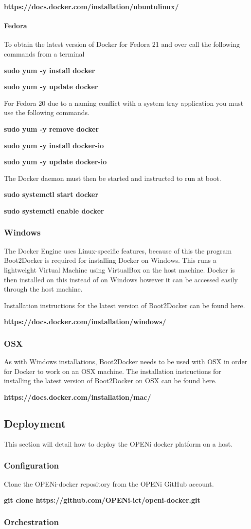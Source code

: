 \documentclass[10pt,a4paper]{article}
\begin{document}
\centerline{\textbf{https://docs.docker.com/installation/ubuntulinux/}}

\paragraph{Fedora}
To obtain the latest version of Docker for Fedora 21 and over call the following commands from a terminal

\centerline{\textbf{sudo yum -y install docker}}
\centerline{\textbf{sudo yum -y update docker}}

For Fedora 20 due to a naming conflict with a system tray application you must use the following commands.

\centerline{\textbf{sudo yum -y remove docker}}
\centerline{\textbf{sudo yum -y install docker-io}}
\centerline{\textbf{sudo yum -y update docker-io}}

The Docker daemon must then be started and instructed to run at boot.

\centerline{\textbf{sudo systemctl start docker}}
\centerline{\textbf{sudo systemctl enable docker}}

\subsubsection{Windows}

The Docker Engine uses Linux-specific features, because of this the program Boot2Docker is required for installing Docker on Windows. This runs a lightweight Virtual Machine using VirtualBox on the host machine. Docker is then installed on this instead of on Windows however it can be accessed easily through the host machine.

Installation instructions for the latest version of Boot2Docker can be found here.
\centerline{\textbf{https://docs.docker.com/installation/windows/}}

\subsubsection{OSX}
As with Windows installations, Boot2Docker needs to be used with OSX in order for Docker to work on an OSX machine.
The installation instructions for installing the latest version of Boot2Docker on OSX can be found here.
\centerline{\textbf{https://docs.docker.com/installation/mac/}}

\newpage
 
\subsection{Deployment}
This section will detail how to deploy the OPENi docker platform on a host.

\subsubsection{Configuration}
Clone the OPENi-docker repository from the OPENi GitHub account.

\centerline{\textbf{git clone https://github.com/OPENi-ict/openi-docker.git}}

\subsubsection{Orchestration}
\end{document}
